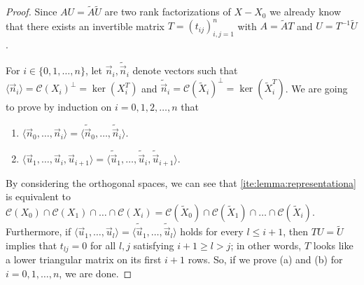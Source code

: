 \documentclass[10pt,a4paper]{amsart}
\newcommand{\Col}[1]{\mathcal{C}(#1)}
\newcommand{\vn}{\vec{n}}
\newcommand{\vu}{\vec{u}}
\begin{document}
\begin{proof}
Since $AU = \tilde A \tilde U$ are two rank factorizations of $X-X_0$ we already know that there exists an invertible matrix $T= (t_{ij})_{i,j =1}^n$ with $A = \tilde AT$ and $U = T^{-1} \tilde U$. 




For $i\in \{0,1,\ldots,n\}$, let $\vn_i, \tilde \vn_i$ denote vectors such that $\langle \vn_i \rangle = \Col{X_i}^\bot = \ker(X_i^T)$ and $\tilde \vn_i = \Col{\tilde X_i}^\bot = \ker(\tilde X_i^T)$. We are going to prove by induction on $i=0,1,2,\ldots, n$ that
\begin{enumerate}[label=(\alph*)]
\item\label{ite:lemma:representationa} $\langle \vn_0,\ldots,\vn_i \rangle = \langle \tilde \vn_0,\ldots,\tilde \vn_i \rangle$.
\item\label{ite:lemma:representationb} $\langle \vu_1,\ldots,\vu_i, \vu_{i+1} \rangle = \langle \tilde \vu_1,\ldots,\tilde \vu_{i}, \tilde \vu_{i+1} \rangle$.
\end{enumerate}

By considering the orthogonal spaces, we can see that \ref{ite:lemma:representationa} is equivalent to $\Col{X_0} \cap \Col{X_1} \cap \ldots \cap \Col{X_i} = \Col{\tilde X_0} \cap \Col{\tilde X_1} \cap \ldots \cap \Col{\tilde X_i}$. Furthermore, if $\langle \vu_1,\ldots, \vu_{l} \rangle = \langle \tilde \vu_1,\ldots,\tilde \vu_{l} \rangle$ holds for every $l\leq i+1$, then $TU = \tilde U$ implies that $t_{lj} = 0$ for all $l,j$ satisfying $i+1 \geq l>j$; in other words, $T$ looks like a lower triangular matrix on its first $i+1$ rows. So, if we prove (a) and (b) for $i=0,1,\ldots,n$, we are done.


\end{proof}
\end{document}
